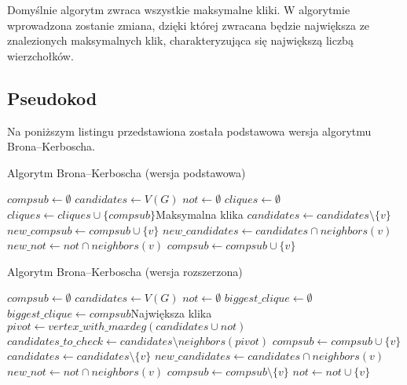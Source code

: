 \documentclass[12pt, a4paper]{article}
\begin{document}
Domyślnie algorytm zwraca wszystkie maksymalne kliki. W algorytmie wprowadzona zostanie zmiana, dzięki której zwracana będzie największa ze znalezionych maksymalnych klik, charakteryzująca się największą liczbą wierzchołków.

\subsection{Pseudokod}
Na poniższym listingu przedstawiona została podstawowa wersja algorytmu Brona--Kerboscha. 
\begin{algorithm}[!htb]
\caption{Algorytm Brona--Kerboscha (wersja podstawowa)}\label{bron1}
\begin{algorithmic}[1]
\State $compsub \gets \emptyset$
\State $candidates \gets V(G)$
\State $not \gets \emptyset$
\State $cliques \gets \emptyset$
		 \State $cliques \gets cliques \cup \{compsub\}$\Comment Maksymalna klika
	\Else
		\State $candidates \gets candidates \setminus \{v\}$
		\State $new\_compsub \gets compsub \cup \{v\}$
		\State $new\_candidates \gets candidates \cap neighbors(v)$
		\State $new\_not \gets not \cap neighbors(v)$
		\State{}
		\State $compsub \gets compsub \cup \{v\}$
	\EndFor
	\EndIf
\EndFunction
\end{algorithmic}
\end{algorithm}

\begin{algorithm}[!htb]
\caption{Algorytm Brona--Kerboscha (wersja rozszerzona)}\label{bron2}
\begin{algorithmic}[1]
\State $compsub \gets \emptyset$
\State $candidates \gets V(G)$
\State $not \gets \emptyset$
\State $biggest\_clique \gets \emptyset$
		 	\State $biggest\_clique \gets compsub$\Comment Największa klika
		 \EndIf
	\Else
	\State $pivot \gets vertex\_with\_maxdeg(candidates \cup not)$
	\State $candidates\_to\_check \gets candidates \setminus neighbors(pivot)$
		\State $compsub \gets compsub \cup \{v\}$
		\State $candidates \gets candidates \setminus \{v\}$
		\State $new\_candidates \gets candidates \cap neighbors(v)$
		\State $new\_not \gets not \cap neighbors(v)$
		\State{}
		\State $compsub \gets compsub \setminus \{v\}$
		\State $not \gets not \cup \{v\}$
	\EndFor
	\EndIf
\EndFunction
\end{algorithmic}
\end{algorithm}
\end{document}
